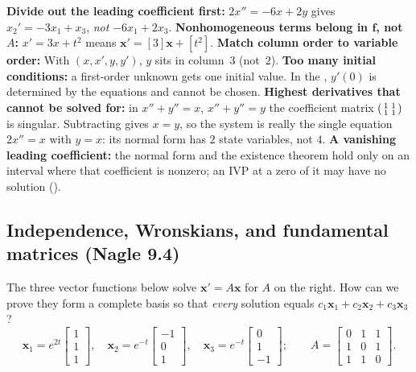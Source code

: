 \documentclass[10pt]{scrartcl}
\newcommand{\vv}[1]{\mathbf{#1}}
\begin{document}
\begin{trapbox}
  \ii \textbf{Divide out the leading coefficient first:} $2x''=-6x+2y$ gives $x_2'=-3x_1+x_3$, \emph{not} $-6x_1+2x_3$.
  \ii \textbf{Nonhomogeneous terms belong in $\vv f$, not $A$:} $x'=3x+t^2$ means $\vv x'=[3]\vv x+[t^2]$.
  \ii \textbf{Match column order to variable order:} With $(x,x',y,y')$, $y$ sits in column~$3$ (not~$2$).
  \ii \textbf{Too many initial conditions:} a first-order unknown gets one initial value. In the , $y'(0)$ is determined by the equations and cannot be chosen.
  \ii \textbf{Highest derivatives that cannot be solved for:} in $x''+y''=x$, $x''+y''=y$ the coefficient matrix $\begin{psmallmatrix}1&1\\1&1\end{psmallmatrix}$ is singular. Subtracting gives $x=y$, so the system is really the single equation $2x''=x$ with $y=x$: its normal form has $2$ state variables, not $4$.
  \ii \textbf{A vanishing leading coefficient:} the normal form and the existence theorem hold only on an interval where that coefficient is nonzero; an IVP at a zero of it may have no solution ().
\end{trapbox}

\subsection{Independence, Wronskians, and fundamental matrices (Nagle 9.4)}
\begin{qbox}
  The three vector functions below solve $\vv x'=A\vv x$ for $A$ on the right. How can we prove they form a complete basis so that \emph{every} solution equals $c_1\vv x_1+c_2\vv x_2+c_3\vv x_3$?
  \[
    \vv x_1=e^{2t}\begin{bmatrix}1\\1\\1\end{bmatrix},\quad
    \vv x_2=e^{-t}\begin{bmatrix}-1\\0\\1\end{bmatrix},\quad
    \vv x_3=e^{-t}\begin{bmatrix}0\\1\\-1\end{bmatrix};\qquad
    A=\begin{bmatrix}0&1&1\\1&0&1\\1&1&0\end{bmatrix}.
  \]
\end{qbox}
\end{document}
